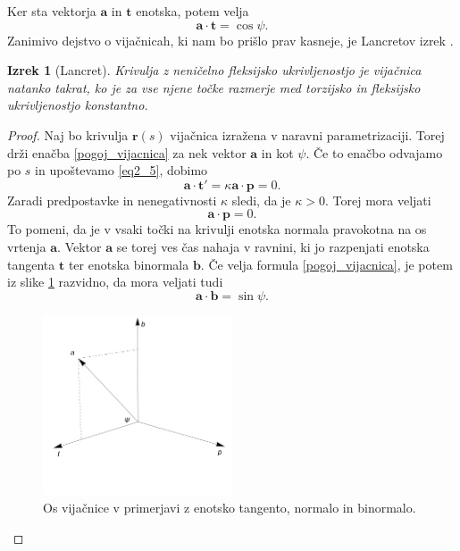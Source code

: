 \documentclass[12pt,a4paper,twoside]{article}
\theoremstyle{definition} %
\theoremstyle{plain} %
\newtheorem{izrek}[definicija]{Izrek}
\theoremstyle{primerstyle}
\numberwithin{equation}{section}  %
\newcommand{\tV}{\mathbf{t}}
\newcommand{\aV}{\mathbf{a}}
\newcommand{\bV}{\mathbf{b}}
\newcommand{\pV}{\mathbf{p}}
\newcommand{\rV}{\mathbf{r}}
\begin{document}
Ker sta vektorja $\aV$ in $\tV$ enotska, potem velja
\begin{equation}
	\label{pogoj_vijacnica}
	\aV \cdot \tV=\cos \psi.
\end{equation}
Zanimivo dejstvo o vijačnicah, ki nam bo prišlo prav kasneje, je Lancretov izrek \cite[str.\ 41]{kreyszig2019differential}.
\begin{izrek}[Lancret]
	\label{lancret}
	Krivulja z neničelno fleksijsko ukrivljenostjo je vijačnica natanko takrat, ko je za vse njene točke razmerje med torzijsko in fleksijsko ukrivljenostjo konstantno.
\end{izrek}
\begin{proof}
	Naj bo krivulja $\rV(s)$ vijačnica izražena v naravni parametrizaciji. Torej drži enačba \eqref{pogoj_vijacnica} za nek vektor $\aV$ in kot $\psi.$ Če to enačbo odvajamo po $s$ in upoštevamo \eqref{eq2_5}, dobimo
	\begin{equation*}
		\aV \cdot \tV'=\kappa \aV \cdot \pV=0.
	\end{equation*}
	Zaradi predpostavke in nenegativnosti $\kappa$ sledi, da je $\kappa > 0.$ Torej mora veljati
	\begin{equation}
	\label{eq4_19}
	\aV \cdot \pV=0.
	\end{equation}
	To pomeni, da je v vsaki točki na krivulji enotska normala pravokotna na os vrtenja $\aV.$ Vektor $\aV$ se torej ves čas nahaja v ravnini, ki jo razpenjati enotska tangenta $\tV$ ter enotska binormala $\bV.$ Če velja formula \eqref{pogoj_vijacnica}, je potem iz slike \ref{fig:lancret} razvidno, da mora veljati tudi
	\begin{equation*}
		\aV \cdot \bV=\sin \psi.
	\end{equation*}
	\begin{figure}[h!]
	  \centering
	  \includegraphics[width=0.5\textwidth]{images/lancret.pdf}
	  \caption[Os vijačnice v primerjavi z enotsko tangento, normalo in binormalo]{Os vijačnice v primerjavi z enotsko tangento, normalo in binormalo.}
	  \label{fig:lancret}
	\end{figure}
	

\end{proof}
\end{document}
